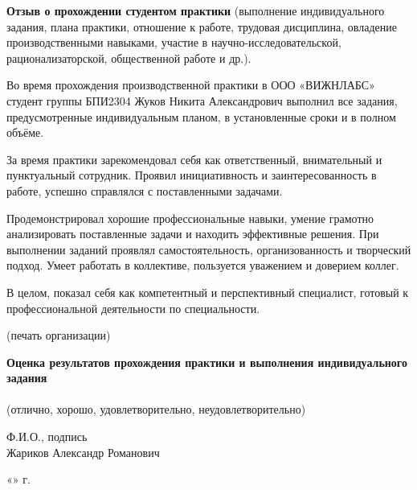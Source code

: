 \documentclass[12pt,a4paper]{report}
\begin{document}
\vspace{1em}

\textbf{Отзыв о прохождении студентом практики} (выполнение индивидуального задания, плана практики, отношение к работе, трудовая дисциплина, овладение производственными навыками, участие в научно-исследовательской, рационализаторской, общественной работе и др.).

\vspace{1em}

\parbox{0.95\textwidth}{
Во время прохождения производственной практики в ООО «ВИЖНЛАБС» студент группы БПИ2304 Жуков Никита Александрович выполнил все задания, предусмотренные индивидуальным планом, в установленные сроки и в полном объёме.

За время практики зарекомендовал себя как ответственный, внимательный и пунктуальный сотрудник. Проявил инициативность и заинтересованность в работе, успешно справлялся с поставленными задачами.

Продемонстрировал хорошие профессиональные навыки, умение грамотно анализировать поставленные задачи и находить эффективные решения. При выполнении заданий проявлял самостоятельность, организованность и творческий подход. Умеет работать в коллективе, пользуется уважением и доверием коллег.

В целом, показал себя как компетентный и перспективный специалист, готовый к профессиональной деятельности по специальности.
}

\vspace{2em}

\hrulefill

\vspace{1em}

(печать организации)

\vspace{3em}

\textbf{Оценка результатов прохождения практики и выполнения индивидуального задания} \\
\hrulefill \\
(отлично, хорошо, удовлетворительно, неудовлетворительно)

\vspace{1em}

Ф.И.О., подпись \hrulefill \\
Жариков Александр Романович \hrulefill

\vspace{1em}

«\hrulefill »  г.
\end{document}

